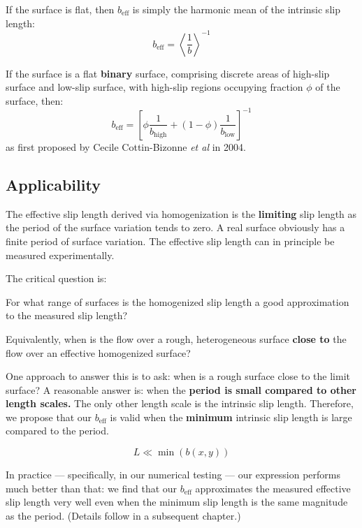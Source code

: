 \documentclass[12pt, a4paper, twoside, openright]{book}
\newcommand{\beff}{\ensuremath{b_{\mathrm{eff}}}}
\begin{document}
If the surface is flat, then $\beff$ is simply the harmonic mean of the intrinsic slip length:
\begin{equation}
\beff = \left< \frac{1}{b} \right> ^{-1}
\end{equation}

If the surface is a flat \textbf{binary} surface, comprising discrete areas of high-slip surface and low-slip surface, with high-slip regions occupying fraction $\phi$ of the surface, then:
\begin{equation}
\beff = \left[ \phi \frac{1}{ b_{\mathrm{high}} }  + (1 -\phi) \frac{1}{ b_{\mathrm{low}}} \right]^{-1}
\end{equation}
as first proposed by Cecile Cottin-Bizonne \emph{et al} in 2004.


\subsection*{Applicability}

The effective slip length derived via homogenization is the \textbf{limiting} slip length as the period of the surface variation tends to zero.  A real surface obviously has a finite period of surface variation.  The effective slip length can in principle be measured experimentally.  

The critical question is:

\vspace{1em}
For what range of surfaces is the homogenized slip length a good approximation to the measured slip length?

\vspace{1em}
Equivalently, when is the flow over a rough, heterogeneous surface \textbf{close to} the flow over an effective homogenized surface?  

One approach to answer this is to ask: when is a rough surface close to the limit surface?  A reasonable answer is: when the \textbf{period is small compared to other length scales.}
The only other length scale is the intrinsic slip length.  Therefore, we propose that our $\beff$ is valid when the \textbf{minimum} intrinsic slip length is large compared to the period.

\begin{equation}
L \ll \min(b(x,y))
\end{equation}

In practice --- specifically, in our numerical testing --- our expression performs much better than that: we find that our $\beff$ approximates the measured effective slip length very well even when the minimum slip length is the same magnitude as the period.
(Details follow in a subsequent chapter.)







\end{document}
